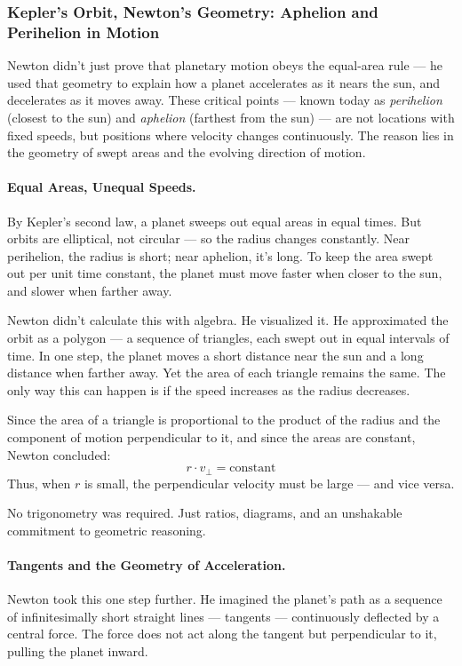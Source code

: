 \subsubsection{Kepler’s Orbit, Newton’s Geometry: Aphelion and Perihelion in Motion}

Newton didn’t just prove that planetary motion obeys the equal-area rule — he used that geometry to explain how a planet accelerates as it nears the sun, and decelerates as it moves away. These critical points — known today as \textit{perihelion} (closest to the sun) and \textit{aphelion} (farthest from the sun) — are not locations with fixed speeds, but positions where velocity changes continuously. The reason lies in the geometry of swept areas and the evolving direction of motion.

\paragraph{Equal Areas, Unequal Speeds.}  
By Kepler’s second law, a planet sweeps out equal areas in equal times. But orbits are elliptical, not circular — so the radius changes constantly. Near perihelion, the radius is short; near aphelion, it's long. To keep the area swept out per unit time constant, the planet must move faster when closer to the sun, and slower when farther away.

Newton didn’t calculate this with algebra. He visualized it. He approximated the orbit as a polygon — a sequence of triangles, each swept out in equal intervals of time. In one step, the planet moves a short distance near the sun and a long distance when farther away. Yet the area of each triangle remains the same. The only way this can happen is if the speed increases as the radius decreases.

Since the area of a triangle is proportional to the product of the radius and the component of motion perpendicular to it, and since the areas are constant, Newton concluded:
\[
r \cdot v_\perp = \text{constant}
\]
Thus, when $r$ is small, the perpendicular velocity must be large — and vice versa.

No trigonometry was required. Just ratios, diagrams, and an unshakable commitment to geometric reasoning.

\paragraph{Tangents and the Geometry of Acceleration.}  
Newton took this one step further. He imagined the planet’s path as a sequence of infinitesimally short straight lines — tangents — continuously deflected by a central force. The force does not act along the tangent but perpendicular to it, pulling the planet inward.

